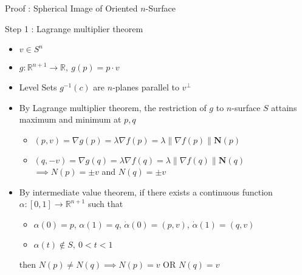 \documentclass{beamer}
\begin{document}
\begin{frame}{Proof : Spherical Image of Oriented $n$-Surface}
\begin{block}{Step 1 : Lagrange multiplier theorem}
\begin{itemize}
	\item $v \in S^n$
	\item $g : \mathbb{R}^{n+1} \to \mathbb{R},\ g(p) = p \cdot v$
	\item Level Sets $g^{-1}(c)$ are $n$-planes parallel to $v^\perp$
	\item By Lagrange multiplier theorem, the restriction of $g$ to $n$-surface $S$ attains maximum and minimum at $p,q$
	\begin{itemize}
		\item $(p,v) = \nabla g(p) = \lambda \nabla f(p) = \lambda \|\nabla f(p) \|\mathbf{N}(p)$
		\item $(q,-v) = \nabla g(q) = \lambda \nabla f(q) = \lambda \|\nabla f(q) \|\mathbf{N}(q)$\\
		$\implies N(p) = \pm v$ and $N(q) = \pm v$
	\end{itemize}
	\item By intermediate value theorem, if there exists a continuous function $\alpha : [0,1] \to \mathbb{R}^{n+1}$ such that
	\begin{itemize}
		\item $\alpha(0) = p$, $\alpha(1) = q$, $\dot{\alpha}(0) = (p,v)$, $\dot{\alpha}(1) = (q,v)$ 
		\item $\alpha(t) \notin S,\ 0 < t < 1$
	\end{itemize}
		then $N(p) \ne N(q) \implies N(p) = v \text{ OR } N(q) = v$
\end{itemize}
\end{block}
\end{frame}
\end{document}
